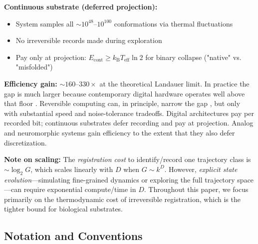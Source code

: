 \documentclass[12pt]{article}
\numberwithin{equation}{section}
\newcommand{\kB}{k_{\mathrm{B}}}
\newcommand{\Teff}{T_{\mathrm{eff}}}
\begin{document}
\textbf{Continuous substrate (deferred projection):}
\begin{itemize}
\item System samples all $\sim 10^{48}$--$10^{100}$ conformations via thermal fluctuations
\item No irreversible records made during exploration
\item Pay only at projection: $E_{\text{cont}} \ge \kB\Teff\ln 2$ for binary collapse ("native" vs. "misfolded")
\end{itemize}

\textbf{Efficiency gain:} $\sim 160$--$330\times$ at the theoretical Landauer limit. In practice the gap is much larger because contemporary digital hardware operates well above that floor \cite{horowitz2014}. Reversible computing can, in principle, narrow the gap \cite{bennett1982}, but only with substantial speed and noise-tolerance tradeoffs. Digital architectures pay per recorded bit; continuous substrates defer recording and pay at projection. Analog and neuromorphic systems gain efficiency to the extent that they also defer discretization.

\textbf{Note on scaling:} The \emph{registration cost} to identify/record one trajectory class is $\sim\log_2 G$, which scales linearly with $D$ when $G \sim k^D$. However, \emph{explicit state evolution}---simulating fine-grained dynamics or exploring the full trajectory space---can require exponential compute/time in $D$. Throughout this paper, we focus primarily on the thermodynamic cost of irreversible registration, which is the tighter bound for biological substrates.

\subsection{Notation and Conventions}
\end{document}
